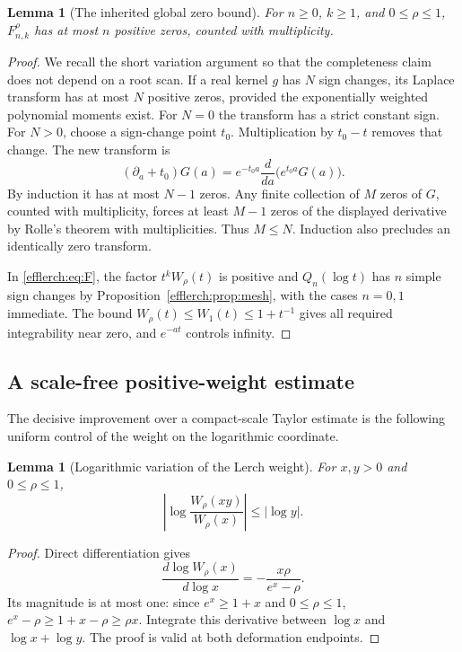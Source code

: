 \documentclass[11pt,letterpaper]{article}
\newtheorem{lemma}[theorem]{Lemma}
\theoremstyle{definition}
\theoremstyle{remark}
\begin{document}
\begin{lemma}[The inherited global zero bound]
\label{efflerch:lem:variation}
For $n\geq0$, $k\geq1$, and $0\leq\rho\leq1$,
$F_{n,k}^\rho$ has at most $n$ positive zeros, counted with multiplicity.
\end{lemma}
\begin{proof}
We recall the short variation argument so that the completeness claim
does not depend on a root scan.  If a real kernel $g$ has
$N$ sign changes, its Laplace transform has at most $N$ positive zeros,
provided the exponentially weighted polynomial moments exist.
For $N=0$ the transform has a strict constant sign.  For $N>0$, choose
a sign-change point $t_0$.  Multiplication by $t_0-t$ removes that
change.  The new transform is
\[
 (\partial_a+t_0)G(a)
   =e^{-t_0a}\frac{d}{da}\bigl(e^{t_0a}G(a)\bigr).
\]
By induction it has at most $N-1$ zeros.  Any finite collection of
$M$ zeros of $G$, counted with multiplicity, forces at least $M-1$
zeros of the displayed derivative by Rolle's theorem with multiplicities.
Thus $M\leq N$.  Induction also precludes an identically zero transform.

In \eqref{efflerch:eq:F}, the factor $t^kW_\rho(t)$ is positive and
$Q_n(\log t)$ has $n$ simple sign changes by
Proposition~\ref{efflerch:prop:mesh}, with the cases $n=0,1$ immediate.
The bound $W_\rho(t)\leq W_1(t)\leq1+t^{-1}$ gives all required
integrability near zero, and $e^{-at}$ controls infinity.
\end{proof}

\subsection{A scale-free positive-weight estimate}

The decisive improvement over a compact-scale Taylor estimate is the
following uniform control of the weight on the logarithmic coordinate.

\begin{lemma}[Logarithmic variation of the Lerch weight]
\label{efflerch:lem:weight}
For $x,y>0$ and $0\leq\rho\leq1$,
\begin{equation}\label{efflerch:eq:weight}
 \left|\log\frac{W_\rho(xy)}{W_\rho(x)}\right|\leq|\log y|.
\end{equation}
\end{lemma}
\begin{proof}
Direct differentiation gives
\[
 \frac{d\log W_\rho(x)}{d\log x}
  =-\frac{x\rho}{e^x-\rho}.
\]
Its magnitude is at most one: since $e^x\geq1+x$ and $0\leq\rho\leq1$,
$e^x-\rho\geq1+x-\rho\geq\rho x$.
Integrate this derivative between $\log x$ and $\log x+\log y$.
The proof is valid at both deformation endpoints.
\end{proof}
\end{document}
